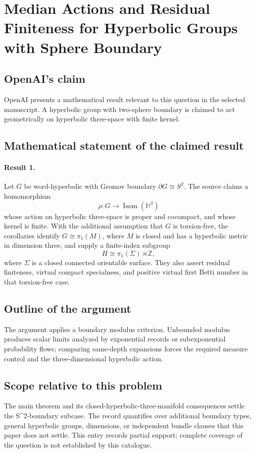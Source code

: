 \documentclass[11pt]{article}
\begin{document}
\section*{Median Actions and Residual Finiteness for Hyperbolic Groups with Sphere Boundary}

\subsection{OpenAI's claim}
OpenAI presents a mathematical result relevant to this question in the selected manuscript. A hyperbolic group with two-sphere boundary is claimed to act geometrically on hyperbolic three-space with finite kernel.

\subsection{Mathematical statement of the claimed result}
\paragraph{Result 1.} Let \(G\) be word-hyperbolic with Gromov boundary \(\partial G\cong S^2\). The source claims a homomorphism
\[
 \rho:G\longrightarrow\operatorname{Isom}(\mathbb H^3)
\]
whose action on hyperbolic three-space is proper and cocompact, and whose kernel is finite. With the additional assumption that \(G\) is torsion-free, the corollaries identify \(G\cong\pi_1(M)\), where \(M\) is closed and has a hyperbolic metric in dimension three, and supply a finite-index subgroup
\[
 H\cong\pi_1(\Sigma)\rtimes\mathbb Z,
\]
where \(\Sigma\) is a closed connected orientable surface. They also assert residual finiteness, virtual compact specialness, and positive virtual first Betti number in that torsion-free case.

\subsection{Outline of the argument}
The argument applies a boundary modulus criterion. Unbounded modulus produces scalar limits analyzed by exponential records or subexponential probability flows; comparing same-depth expansions forces the required measure control and the three-dimensional hyperbolic action.

\subsection{Scope relative to this problem}
The main theorem and its closed-hyperbolic-three-manifold consequences settle the S\textasciicircum{}2-boundary subcase. The record quantifies over additional boundary types, general hyperbolic groups, dimensions, or independent bundle clauses that this paper does not settle. This entry records partial support; complete coverage of the question is not established by this catalogue.
\end{document}
